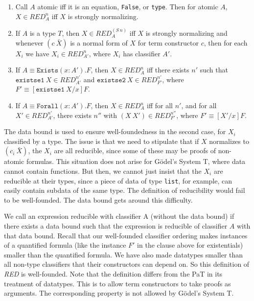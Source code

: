 \documentclass{fundam}
\begin{document}
\begin{enumerate}
\item Call $A$ atomic iff it is an equation, \texttt{False}, 
or \texttt{type}. Then for atomic $A$, $X\in\textit{RED}^n_A$ iff $X$
is strongly normalizing.
\item If $A$ is a type $T$, then $X\in\textit{RED}^{(S\ n)}_A$ iff $X$ is
strongly normalizing and whenever $(c\ \bar{X})$ is a normal form of
$X$ for term constructor $c$, then for each $X_i$ we have
$X_i\in\textit{RED}^n_{A'}$, where $X_i$ has classifier $A'$.
\item If $A \equiv \texttt{Exists}(x : A'). F$, then
$X\in\textit{RED}^n_A$ iff there exists $n'$ such that
$\texttt{existse1}\ X\in\textit{RED}^{n'}_{A'}$ and
$\texttt{existse2}\ X\in\textit{RED}^{n'}_{F'}$, where $F' \equiv
{[\texttt{existse1}\ X/x]F}$.
\item If $A \equiv \texttt{Forall}(x : A').F$, then
$X\in\textit{RED}^n_A$ iff for all $n'$, and for all
$X'\in\textit{RED}^{n'}_{A'}$, there exists $n''$ with $(X\
X')\in\textit{RED}^{n''}_{F'}$, where $F' \equiv [X'/x]F$.
\end{enumerate}

\noindent The data bound is used to ensure well-foundedness in the
second case, for $X_i$ classified by a type.  The issue is that we
need to stipulate that if $X$ normalizes to $(c_i\ \bar{X})$, the
$X_i$ are all reducible, since some of these may be proofs of non-atomic
formulas.  This situation does not arise for G\"odel's System T, where
data cannot contain functions.  But then, we cannot just insist that
the $X_i$ are reducible at their types, since a piece of data of type
\texttt{list}, for example, can easily contain subdata of the same type.
The definition of reducibility would fail to be well-founded.  The data
bound gets around this difficulty.  

We call an expression reducible with classifier A (without the data
bound) if there exists a data bound such that the expression is
reducible of classifier $A$ with that data bound.  Recall that our
well-founded classifier ordering makes instances of a quantified
formula (like the instance $F'$ in the clause above for existentials)
smaller than the quantified formula.  We have also made datatypes
smaller than all non-type classifiers that their constructors can
depend on.  So this definition of \textit{RED} is well-founded.  Note
that the definition differs from the PaT in its treatment of
datatypes.  This is to allow term constructors to take proofs as
arguments.  The corresponding property is not allowed by G\"odel's
System T.
\end{document}
